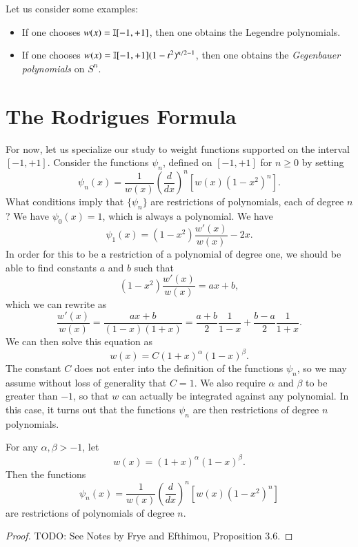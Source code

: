 Let us consider some examples:
%
\begin{itemize}
    \item If one chooses $w(x) = \operatorname{\mathbb{I}}[-1,+1]$, then one obtains the Legendre polynomials.

    \item If one chooses $w(x) = \operatorname{\mathbb{I}}[-1,+1] (1 - t^2)^{n/2 - 1}$, then one obtains the \emph{Gegenbauer polynomials} on $S^n$.
\end{itemize}



\section{The Rodrigues Formula}

For now, let us specialize our study to weight functions supported on the interval $[-1,+1]$. Consider the functions $\psi_n$, defined on $[-1,+1]$ for $n \geq 0$ by setting
%
\[ \psi_n(x) = \frac{1}{w(x)} \left( \frac{d}{dx} \right)^n [ w(x) (1 - x^2)^n ]. \]
%
What conditions imply that $\{ \psi_n \}$ are restrictions of polynomials, each of degree $n$? We have $\psi_0(x) = 1$, which is always a polynomial. We have
%
\[ \psi_1(x) = (1 - x^2) \frac{w'(x)}{w(x)} - 2x. \]
%
In order for this to be a restriction of a polynomial of degree one, we should be able to find constants $a$ and $b$ such that
%
\[ (1 - x^2) \frac{w'(x)}{w(x)} = ax + b, \]
%
which we can rewrite as
%
\[ \frac{w'(x)}{w(x)} = \frac{ax + b}{(1 - x)(1 + x)} = \frac{a + b}{2} \frac{1}{1 - x} + \frac{b - a}{2} \frac{1}{1 + x}. \]
%
We can then solve this equation as
%
\[ w(x) = C (1 + x)^\alpha (1 - x)^\beta. \]
%
The constant $C$ does not enter into the definition of the functions $\psi_n$, so we may assume without loss of generality that $C = 1$. We also require $\alpha$ and $\beta$ to be greater than $-1$, so that $w$ can actually be integrated against any polynomial. In this case, it turns out that the functions $\psi_n$ are then restrictions of degree $n$ polynomials.

\begin{theorem}
    For any $\alpha, \beta > -1$, let
    \[ w(x) = (1 + x)^\alpha (1 - x)^\beta. \]
    Then the functions
    \[ \psi_n(x) = \frac{1}{w(x)} \left( \frac{d}{dx} \right)^n [ w(x) (1 - x^2)^n ] \]
    are restrictions of polynomials of degree $n$.
\end{theorem}
\begin{proof}
    TODO: See Notes by Frye and Efthimou, Proposition 3.6.
\end{proof}

